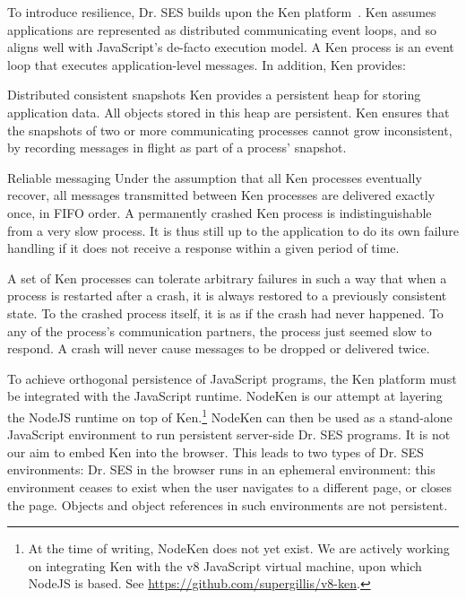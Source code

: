 \documentclass{llncs}
\begin{document}
To introduce resilience, Dr. SES builds upon the Ken platform~\cite{Yoo:CKen}. Ken assumes applications are represented as distributed communicating event loops, and so aligns well with JavaScript's de-facto execution model. A Ken process is an event loop that executes application-level messages. In addition, Ken provides:

\begin{description*}
  \item[Distributed consistent snapshots] Ken provides a persistent heap for storing application data. All objects stored in this heap are persistent. Ken ensures that the snapshots of two or more communicating processes cannot grow inconsistent, by recording messages in flight as part of a process' snapshot.
  \item[Reliable messaging] Under the assumption that all Ken processes eventually recover, all messages transmitted between Ken processes are delivered exactly once, in FIFO order. A permanently crashed Ken process is indistinguishable from a very slow process. It is thus still up to the application to do its own failure handling if it does not receive a response within a given period of time.
\end{description*}

A set of Ken processes can tolerate arbitrary failures in such a way that when a process is restarted after a crash, it is always restored to a previously consistent state. To the crashed process itself, it is as if the crash had never happened. To any of the process's communication partners, the process just seemed slow to respond. A crash will never cause messages to be dropped or delivered twice.

To achieve orthogonal persistence of JavaScript programs, the Ken platform must be integrated with the JavaScript runtime. NodeKen is our attempt at layering the NodeJS runtime on top of Ken.\footnote{
%
At the time of writing, NodeKen does not yet exist. We are actively working on integrating Ken with the v8 JavaScript virtual machine, upon which NodeJS is based. See \url{https://github.com/supergillis/v8-ken}.
%
} NodeKen can then be used as a stand-alone JavaScript environment to run persistent server-side Dr. SES programs. It is not our aim to embed Ken into the browser. This leads to two types of Dr. SES environments: Dr. SES in the browser runs in an ephemeral environment: this environment ceases to exist when the user navigates to a different page, or closes the page. Objects and object references in such environments are not persistent. 
\end{document}
